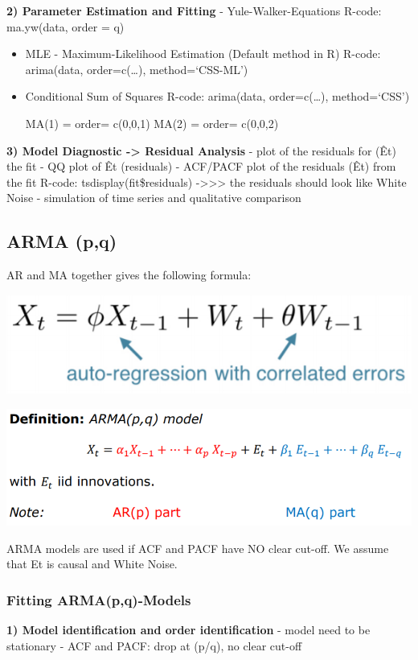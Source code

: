 \documentclass[
]{article}
\begin{document}
\textbf{2) Parameter Estimation and Fitting} - Yule-Walker-Equations
R-code: ma.yw(data, order = q)

\begin{itemize}
\item
  MLE - Maximum-Likelihood Estimation (Default method in R) R-code:
  arima(data, order=c(\ldots), method=`CSS-ML')
\item
  Conditional Sum of Squares R-code: arima(data, order=c(\ldots),
  method=`CSS')

  MA(1) = order= c(0,0,1) MA(2) = order= c(0,0,2)
\end{itemize}

\textbf{3) Model Diagnostic -\textgreater{} Residual Analysis} - plot of
the residuals for (Êt) the fit - QQ plot of Êt (residuals) - ACF/PACF
plot of the residuals (Êt) from the fit R-code:
tsdisplay(fit\$residuals) -\textgreater\textgreater\textgreater{} the
residuals should look like White Noise - simulation of time series and
qualitative comparison

\hypertarget{arma-pq}{%
\subsection{ARMA (p,q)}\label{arma-pq}}

AR and MA together gives the following formula:

\includegraphics[width=0.25\linewidth]{arma}

\includegraphics[width=0.5\linewidth]{arma1}

ARMA models are used if ACF and PACF have NO clear cut-off. We assume
that Et is causal and White Noise.

\hypertarget{fitting-armapq-models}{%
\subsubsection{Fitting ARMA(p,q)-Models}\label{fitting-armapq-models}}

\textbf{1) Model identification and order identification} - model need
to be stationary - ACF and PACF: drop at (p/q), no clear cut-off
\end{document}
